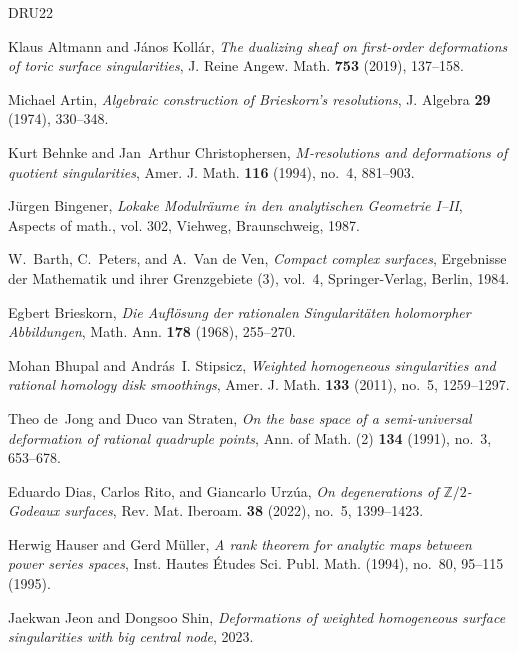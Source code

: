 \documentclass{amsart}
\theoremstyle{definition}
\theoremstyle{remark}
\begin{document}
\begin{thebibliography}{DRU22}

Klaus Altmann and J{\'a}nos Koll{\'a}r, \emph{The dualizing sheaf on
  first-order deformations of toric surface singularities}, J. Reine Angew.
  Math. \textbf{753} (2019), 137--158. 

Michael Artin, \emph{Algebraic construction of {B}rieskorn's resolutions}, J.
  Algebra \textbf{29} (1974), 330--348.

Kurt Behnke and Jan~Arthur Christophersen, \emph{{$M$}-resolutions and
  deformations of quotient singularities}, Amer. J. Math. \textbf{116} (1994),
  no.~4, 881--903. 

J\"urgen Bingener, \emph{Lokake {M}odulr\"aume in den analytischen {G}eometrie
  {I}--{II}}, Aspects of math., vol. 302, Viehweg, Braunschweig, 1987.

W.~Barth, C.~Peters, and A.~V{an de Ven}, \emph{Compact complex surfaces},
  Ergebnisse der Mathematik und ihrer Grenzgebiete (3), vol.~4,
  Springer-Verlag, Berlin, 1984.

Egbert Brieskorn, \emph{Die {A}ufl\"osung der rationalen {S}ingularit\"aten
  holomorpher {A}bbildungen}, Math. Ann. \textbf{178} (1968), 255--270.

Mohan Bhupal and Andr\'{a}s~I. Stipsicz, \emph{Weighted homogeneous
  singularities and rational homology disk smoothings}, Amer. J. Math.
  \textbf{133} (2011), no.~5, 1259--1297. 

Theo de~Jong and Duco van Straten, \emph{On the base space of a semi-universal
  deformation of rational quadruple points}, Ann. of Math. (2) \textbf{134}
  (1991), no.~3, 653--678. 

Eduardo Dias, Carlos Rito, and Giancarlo Urz\'{u}a, \emph{On degenerations of
  {$\mathbb{Z}/2$}-{G}odeaux surfaces}, Rev. Mat. Iberoam. \textbf{38} (2022),
  no.~5, 1399--1423. 

Herwig Hauser and Gerd M{\"u}ller, \emph{A rank theorem for analytic maps
  between power series spaces}, Inst. Hautes \'Etudes Sci. Publ. Math. (1994),
  no.~80, 95--115 (1995). 

Jaekwan Jeon and Dongsoo Shin, \emph{Deformations of weighted homogeneous
  surface singularities with big central node}, 2023.


\end{thebibliography}
\end{document}
